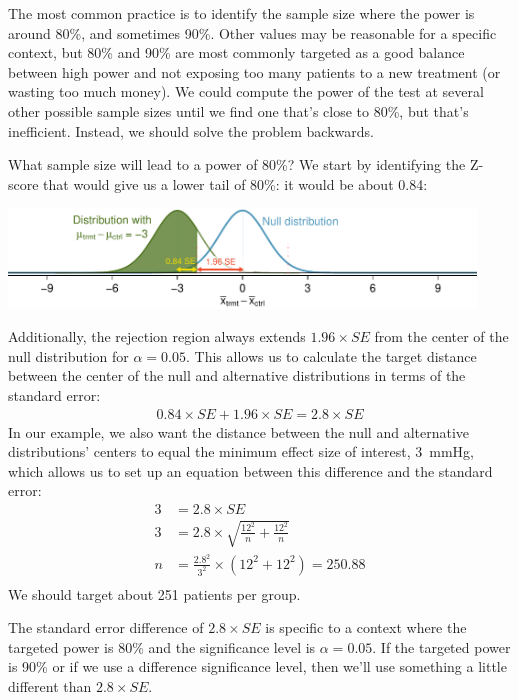The most common practice is to identify the sample size where the power is around 80\%, and sometimes 90\%. Other values may be reasonable for a specific context, but 80\% and 90\% are most commonly targeted as a good balance between high power and not exposing too many patients to a new treatment (or wasting too much money). We could compute the power of the test at several other possible sample sizes until we find one that's close to 80\%, but that's inefficient. Instead, we should solve the problem backwards.

\begin{example}{What sample size will lead to a power of 80\%?}
We start by identifying the Z-score that would give us a lower tail of 80\%: it would be about 0.84:
\begin{center}
\includegraphics[width=0.93\textwidth]{ch_inference_for_means/figures/power_best_sample_size/power_best_sample_size}
\end{center}
Additionally, the rejection region always extends $1.96\times SE$ from the center of the null distribution for $\alpha = 0.05$. This allows us to calculate the target distance between the center of the null and alternative distributions in terms of the standard error:
\begin{align*}
0.84 \times SE + 1.96 \times SE = 2.8 \times SE
\end{align*}
In our example, we also want the distance between the null and alternative distributions' centers to equal the minimum effect size of interest, 3~mmHg, which allows us to set up an equation between this difference and the standard error:
\begin{align*}
3 &= 2.8 \times SE \\
3 &= 2.8 \times \sqrt{\frac{12^2}{n} + \frac{12^2}{n}} \\
n &= \frac{2.8^2}{3^2} \times \left( 12^2 + 12^2 \right) = 250.88 \\
\end{align*}
We should target about 251 patients per group.
\end{example}

The standard error difference of $2.8 \times SE$ is specific to a context where the targeted power is 80\% and the significance level is $\alpha = 0.05$. If the targeted power is 90\% or if we use a difference significance level, then we'll use something a little different than $2.8 \times SE$.

